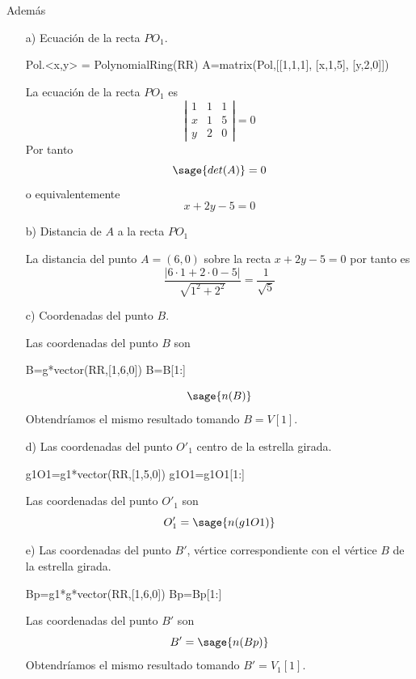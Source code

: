 \documentclass{amsart}
\begin{document}
Además

\begin{enumerate} 
\item[a)] Ecuación de la recta $PO_1$.

\begin{sageblock}
Pol.<x,y> = PolynomialRing(RR)
A=matrix(Pol,[[1,1,1],
            [x,1,5],
            [y,2,0]])
\end{sageblock}

La ecuación de la recta $PO_1$ es
\[ \left| \begin{array}{rrr}
1 & 1 & 1  \\            
x & 1 & 5  \\          
y & 2 & 0            
\end{array} \right| = 0\] Por tanto \[ \sage{det(A)} = 0 \] o equivalentemente \[ x + 2y - 5 = 0 \]

\item[b)] Distancia de $A$ a la recta $PO_1$


La distancia del punto $A = (6,0)$ sobre la recta $x+2y-5=0$ por tanto es \[ \frac{\vert 6\cdot 1+2\cdot 0-5\vert}{\sqrt{1^2+2^2}} = \frac{1}{\sqrt{5}} \]


\item[c)] Coordenadas del punto $B$.

Las coordenadas del punto $B$ son
\begin{sageblock}
B=g*vector(RR,[1,6,0])
B=B[1:]
\end{sageblock}
\[ \sage{n(B)} \] Obtendríamos el mismo resultado tomando $B=V[1]$.

\item[d)] Las coordenadas del punto $O'_1$ centro de la estrella girada.
 
\begin{sageblock}
g1O1=g1*vector(RR,[1,5,0])
g1O1=g1O1[1:]
\end{sageblock}
Las coordenadas del punto $O'_1$ son
\[ O'_1 = \sage{n(g1O1)} \]

\item[e)] Las coordenadas del punto $B'$, vértice correspondiente con el vértice $B$ de la estrella girada.

\begin{sageblock}
Bp=g1*g*vector(RR,[1,6,0])
Bp=Bp[1:]
\end{sageblock}

Las coordenadas del punto $B'$ son
\[ B' = \sage{n(Bp)} \] Obtendríamos el mismo resultado tomando $B'=V_1[1]$.

\end{enumerate}
\end{document}
